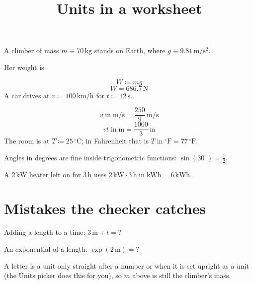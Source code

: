 \documentclass[11pt,a4paper]{article}
\title{Units in a worksheet}
\date{}
\theoremstyle{plain}
\theoremstyle{definition}
\theoremstyle{remark}
\begin{document}
\maketitle
A climber of mass $m \equiv 70\,\mathrm{kg}$ stands on Earth, where $g \equiv 9.81\,\mathrm{m/s^2}$.

Her weight is

\begin{equation*}
  W \coloneqq  m g
\end{equation*}
\begin{equation*}
  W = 686.7\,\mathrm{N}
\end{equation*}
A car drives at $v \coloneqq  100\,\mathrm{km/h}$ for $t \coloneqq  12\,\mathrm{s}$.

\begin{equation*}
  v \operatorname{in} \mathrm{m/s} = \frac{250}{9}\,\mathrm{m/s}
\end{equation*}
\begin{equation*}
  v t \operatorname{in} \mathrm{m} = \frac{1000}{3}\,\mathrm{m}
\end{equation*}
The room is at $T \coloneqq  25\,{}^\circ\mathrm{C}$; in Fahrenheit that is $T \operatorname{in} {}^\circ\mathrm{F} = 77\,\mathrm{^\circ F}$.

Angles in degrees are fine inside trigonometric functions: $\sin(30^\circ) = \frac{1}{2}$.

A $2\,\mathrm{kW}$ heater left on for $3\,\mathrm{h}$ uses $2\,\mathrm{kW} \cdot 3\,\mathrm{h} \operatorname{in} \mathrm{kWh} = 6\,\mathrm{kWh}$.

\section*{Mistakes the checker catches}

Adding a length to a time: $3\,\mathrm{m} + t = ?$

An exponential of a length: $\exp(2\,\mathrm{m}) = ?$

A letter is a unit only straight after a number or when it is set upright as a unit (the Units picker does this for you), so $m$ above is still the climber's mass.
\end{document}

